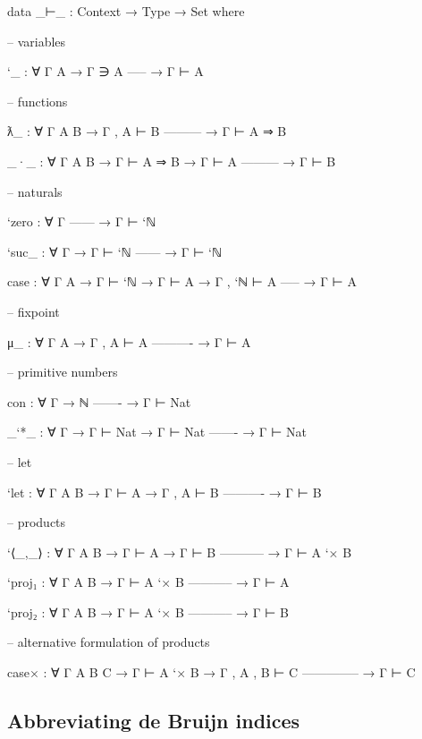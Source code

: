 \begin{fence}
\begin{code}
data _⊢_ : Context → Type → Set where

  -- variables

  `_ : ∀ {Γ A}
    → Γ ∋ A
      -----
    → Γ ⊢ A

  -- functions

  ƛ_  :  ∀ {Γ A B}
    → Γ , A ⊢ B
      ---------
    → Γ ⊢ A ⇒ B

  _·_ : ∀ {Γ A B}
    → Γ ⊢ A ⇒ B
    → Γ ⊢ A
      ---------
    → Γ ⊢ B

  -- naturals

  `zero : ∀ {Γ}
      ------
    → Γ ⊢ `ℕ

  `suc_ : ∀ {Γ}
    → Γ ⊢ `ℕ
      ------
    → Γ ⊢ `ℕ

  case : ∀ {Γ A}
    → Γ ⊢ `ℕ
    → Γ ⊢ A
    → Γ , `ℕ ⊢ A
      -----
    → Γ ⊢ A

  -- fixpoint

  μ_ : ∀ {Γ A}
    → Γ , A ⊢ A
      ----------
    → Γ ⊢ A

  -- primitive numbers

  con : ∀ {Γ}
    → ℕ
      -------
    → Γ ⊢ Nat

  _`*_ : ∀ {Γ}
    → Γ ⊢ Nat
    → Γ ⊢ Nat
      -------
    → Γ ⊢ Nat

  -- let

  `let : ∀ {Γ A B}
    → Γ ⊢ A
    → Γ , A ⊢ B
      ----------
    → Γ ⊢ B

  -- products

  `⟨_,_⟩ : ∀ {Γ A B}
    → Γ ⊢ A
    → Γ ⊢ B
      -----------
    → Γ ⊢ A `× B

  `proj₁ : ∀ {Γ A B}
    → Γ ⊢ A `× B
      -----------
    → Γ ⊢ A

  `proj₂ : ∀ {Γ A B}
    → Γ ⊢ A `× B
      -----------
    → Γ ⊢ B

  -- alternative formulation of products

  case× : ∀ {Γ A B C}
    → Γ ⊢ A `× B
    → Γ , A , B ⊢ C
      --------------
    → Γ ⊢ C

\end{code}
\end{fence}

\hypertarget{abbreviating-de-bruijn-indices}{%
\subsection{Abbreviating de Bruijn
indices}\label{abbreviating-de-bruijn-indices}}

